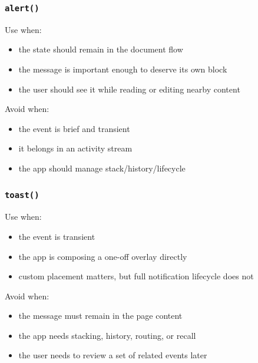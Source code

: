\subsubsection{\texorpdfstring{\texttt{a\allowbreak{}l\allowbreak{}e\allowbreak{}r\allowbreak{}t\allowbreak{}(\allowbreak{})}}{}}\label{record-023-alert}

Use when:

\begin{itemize}
\tightlist
\item
  the state should remain in the document flow
\item
  the message is important enough to deserve its own block
\item
  the user should see it while reading or editing nearby content
\end{itemize}

Avoid when:

\begin{itemize}
\tightlist
\item
  the event is brief and transient
\item
  it belongs in an activity stream
\item
  the app should manage stack/history/lifecycle
\end{itemize}

\subsubsection{\texorpdfstring{\texttt{t\allowbreak{}o\allowbreak{}a\allowbreak{}s\allowbreak{}t\allowbreak{}(\allowbreak{})}}{}}\label{record-023-toast}

Use when:

\begin{itemize}
\tightlist
\item
  the event is transient
\item
  the app is composing a one-off overlay directly
\item
  custom placement matters, but full notification lifecycle does not
\end{itemize}

Avoid when:

\begin{itemize}
\tightlist
\item
  the message must remain in the page content
\item
  the app needs stacking, history, routing, or recall
\item
  the user needs to review a set of related events later
\end{itemize}

